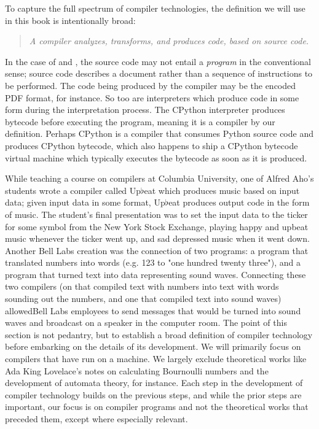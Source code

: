 \vspace{0.5em}

To capture the full spectrum of compiler technologies, the
definition we will use in this book is intentionally broad:
\begin{quotation}
	\textit{A compiler analyzes, transforms, and produces code, based on source code.}
	\label{def:compiler}
\end{quotation}

In the case of \tex and \metafont, the source code may not entail a
\textit{program} in the conventional sense; \tex source code describes a
document rather than a sequence of instructions to be performed. The code being
produced by the compiler may be the encoded PDF format, for instance. So too are
interpreters which produce code in some form during the interpretation
process. The CPython interpreter produces \gls{bytecode} before executing the
program, meaning it is a compiler by our definition. Perhaps CPython is a
compiler that consumes Python source code and produces CPython bytecode, which also
happens to ship a CPython bytecode virtual machine which typically executes the
bytecode as soon as it is produced.

While teaching a course on compilers at
Columbia University, one of Alfred Aho's students wrote a compiler called
Up$\flat$eat which produces music based on input data; given input data in some
format, Up$\flat$eat produces output code in the form of
music\cite{aho_oral_history_2022}. The student's final presentation was to set
the input data to the ticker for some symbol from the New York Stock Exchange,
playing happy and upbeat music whenever the ticker went up, and sad depressed
music when it went down. Another Bell Labs creation was the connection of two
programs: a program that translated numbers into words (e.g. 123 to "one
hundred twenty three"), and a program that turned text into data representing
sound waves. Connecting these two compilers (on that compiled text with numbers
into text with words sounding out the numbers, and one that compiled text into
sound waves) allowedBell Labs employees to send messages that would be turned
into sound waves and broadcast on a speaker in the computer room. The point of
this section is not pedantry, but to establish a broad definition of compiler
technology before embarking on the details of its development. We will primarily
focus on compilers that have run on a machine. We largely exclude theoretical
works like Ada King Lovelace's notes on calculating Bournoulli numbers and the
development of automata theory, for instance. Each step in the development of
compiler technology builds on the previous steps, and while the prior steps are
important, our focus is on compiler programs and not the theoretical works that
preceded them, except where especially relevant.
